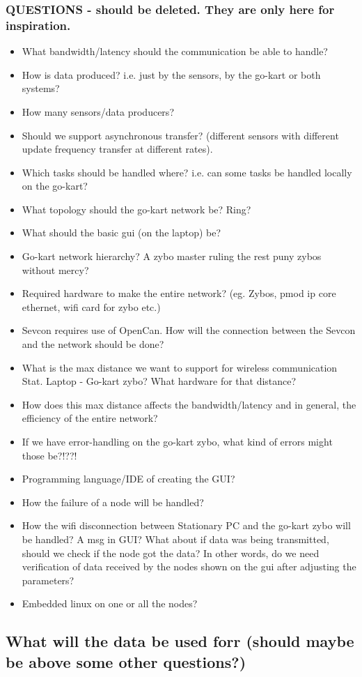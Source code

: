 \subsubsection{QUESTIONS - should be deleted. They are only here for inspiration.}
\begin{itemize}{}
\item What bandwidth/latency should the communication be able to handle?
\item How is data produced? i.e. just by the sensors, by the go-kart or both systems?
\item How many sensors/data producers?\\
\item Should we support asynchronous transfer? (different sensors with different 
update frequency transfer at different rates).\\
\item Which tasks should be handled where? i.e. can some tasks be handled locally on 
the go-kart?
\item What topology should the go-kart network be? Ring?
\item What should the basic gui (on the laptop) be?
\item Go-kart network hierarchy? A zybo master ruling the rest puny zybos without mercy?
\item Required hardware to make the entire network? (eg. Zybos, pmod ip core ethernet, wifi card for zybo etc.)
\item Sevcon requires use of OpenCan. How will the connection between the Sevcon and the network should be done?
\item What is the max distance we want to support for wireless communication Stat. Laptop - Go-kart zybo? What hardware for that distance?
\item How does this max distance affects the bandwidth/latency and in general, the efficiency of the entire network?
\item If we have error-handling on the go-kart zybo, what kind of errors might those be?!??!
\item Programming language/IDE of creating the GUI?
\item How the failure of a node will be handled?
\item How the wifi disconnection between Stationary PC and the go-kart zybo will be handled? A msg in GUI? What about if data was being transmitted, should we check if the node got the data? In other words, do we need verification of data received by the nodes shown on the gui after adjusting the parameters?
\item Embedded linux on one or all the nodes?

\end{itemize}

\subsection{What will the data be used forr (should maybe be above some other questions?)}



